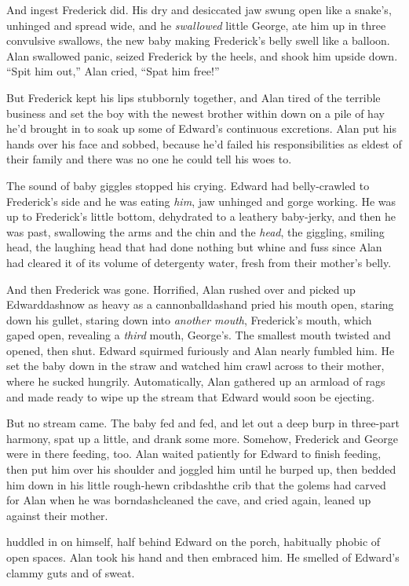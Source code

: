 And ingest Frederick did.  His dry and desiccated jaw swung open like
a snake's, unhinged and spread wide, and he \textit{swallowed} little
George, ate him up in three convulsive swallows, the new baby making
Frederick's belly swell like a balloon.  Alan swallowed panic, seized
Frederick by the heels, and shook him upside down.  ``Spit him out,''
Alan cried, ``Spat him free!''

But Frederick kept his lips stubbornly together, and Alan tired of the
terrible business and set the boy with the newest brother within down
on a pile of hay he'd brought in to soak up some of Edward's
continuous excretions.  Alan put his hands over his face and sobbed,
because he'd failed his responsibilities as eldest of their family and
there was no one he could tell his woes to.

The sound of baby giggles stopped his crying.  Edward had
belly-crawled to Frederick's side and he was eating \textit{him}, jaw
unhinged and gorge working.  He was up to Frederick's little bottom,
dehydrated to a leathery baby-jerky, and then he was past, swallowing
the arms and the chin and the \textit{head}, the giggling, smiling
head, the laughing head that had done nothing but whine and fuss since
Alan had cleared it of its volume of detergenty water, fresh from
their mother's belly.

And then Frederick was gone.  Horrified, Alan rushed over and picked
up Edwarddash{}now as heavy as a cannonballdash{}and pried his mouth open,
staring down his gullet, staring down into \textit{another mouth},
Frederick's mouth, which gaped open, revealing a \textit{third} mouth,
George's.  The smallest mouth twisted and opened, then shut.  Edward
squirmed furiously and Alan nearly fumbled him.  He set the baby down
in the straw and watched him crawl across to their mother, where he
sucked hungrily.  Automatically, Alan gathered up an armload of rags
and made ready to wipe up the stream that Edward would soon be
ejecting.

But no stream came.  The baby fed and fed, and let out a deep burp in
three-part harmony, spat up a little, and drank some more.  Somehow,
Frederick and George were in there feeding, too.  Alan waited
patiently for Edward to finish feeding, then put him over his shoulder
and joggled him until he burped up, then bedded him down in his little
rough-hewn cribdash{}the crib that the golems had carved for Alan when he
was borndash{}cleaned the cave, and cried again, leaned up against their
mother.

 huddled in on himself, half behind Edward on the porch,
habitually phobic of open spaces.  Alan took his hand and then
embraced him.  He smelled of Edward's clammy guts and of sweat.

